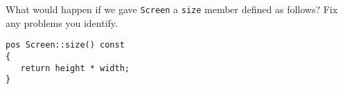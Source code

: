 %
%
\begin{question}
What would happen if we gave \verb|Screen| a \verb|size| member
defined as follows? Fix any problems you identify.
\begin{lstlisting}
pos Screen::size() const
{
   return height * width;
}
\end{lstlisting}
\end{question}
